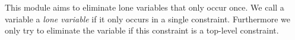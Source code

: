 This module aims to eliminate lone variables that only occur once.
We call a variable a \emph{lone variable} if it only occurs in a single constraint.
Furthermore we only try to eliminate the variable if this constraint is a top-level constraint.

